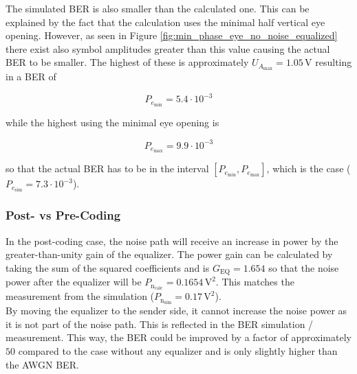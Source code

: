 \documentclass[10pt, a4paper]{article}
\begin{document}
The simulated BER is also smaller than the calculated one. This can be explained by the fact that the calculation uses the minimal half vertical eye opening. However, as seen in Figure \ref{fig:min_phase_eye_no_noise_equalized} there exist also symbol amplitudes greater than this value causing the actual BER to be smaller. The highest of these is approximately $U_{A_{\text{max}}} = 1.05\,\si{\volt}$ resulting in a BER of

\[P_{e_{\text{min}}} = 5.4\cdot 10^{-3}\]

while the highest using the minimal eye opening is

\[P_{e_{\text{max}}} = 9.9\cdot 10^{-3}\]

so that the actual BER has to be in the interval $[P_{e_{\text{min}}}, P_{e_{\text{max}}}]$, which is the case ($P_{e_{\text{sim}}} = 7.3\cdot 10^{-3}$).

\subsubsection{Post- vs Pre-Coding}
In the post-coding case, the noise path will receive an increase in power by the greater-than-unity gain of the equalizer. The power gain can be calculated by taking the sum of the squared coefficients and is $G_{\text{EQ}} = 1.654$ so that the noise power after the equalizer will be $P_{\text{n}_{\text{calc}}} = 0.1654 \,\si{\volt\squared}$. This matches the measurement from the simulation ($P_{\text{n}_{\text{sim}}} = 0.17\,\si{\volt\squared}$).\\

By moving the equalizer to the sender side, it cannot increase the noise power as it is not part of the noise path. This is reflected in the BER simulation / measurement. This way, the BER could be improved by a factor of approximately $50$ compared to the case without any equalizer and is only slightly higher than the AWGN BER.
\end{document}
